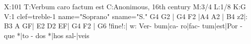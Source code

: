 X:101
T:Verbum caro factum est
C:Anonimous, 16th century
M:3/4
L:1/8
K:G
V:1 clef=treble-1 name="Soprano" sname="S."
G4 G2 | G4 F2 |A4 A2 | B4 z2|: B3 A GF| E2 D2 EF| G4 F2 | G6 !fine!:|
w: Ver- bum|ca- ro|fac- tum|est|Por - que *|to - dos *|hos sal-|veis

